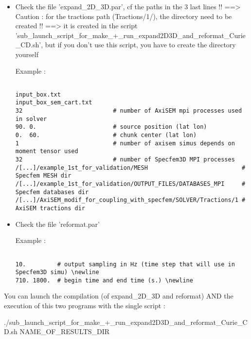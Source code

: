 \documentclass[11pt]{article}
\begin{document}
\begin{itemize}

\item[\textbullet] Check the file 'expand\_2D\_3D.par', cf the paths in the 3 last lines !! ==> Caution : for the tractions path (Tractions/1/), the directory need to be created !! ==> it is created in the script 'sub\_launch\_script\_for\_make\_+\_run\_expand2D3D\_and\_reformat\_Curie\_CD.sh', but if you don't use this script, you have to create the directory yourself

\smallskip

\noindent Example : 
\begin{verbatim}

input_box.txt 
input_box_sem_cart.txt 
32                          # number of AxiSEM mpi processes used in solver  
90. 0.                      # source position (lat lon)  
0.  60.                     # chunk center (lat lon)    
1                           # number of axisem simus depends on moment tensor used  
32                          # number of Specfem3D MPI processes  
/[...]/example_1st_for_validation/MESH                           # Specfem MESH dir
/[...]/example_1st_for_validation/OUTPUT_FILES/DATABASES_MPI     # Specfem databases dir
/[...]/AxiSEM_modif_for_coupling_with_specfem/SOLVER/Tractions/1 # AxiSEM tractions dir

\end{verbatim}

\item[\textbullet] Check the file 'reformat.par'

\smallskip

\noindent Example : 
\begin{verbatim}

10.         # output sampling in Hz (time step that will use in Specfem3D simu) \newline
710. 1800.  # begin time and end time (s.) \newline

\end{verbatim}

\end{itemize}

\medskip

\noindent You can launch the compilation (of expand\_2D\_3D and reformat) AND the execution of this two programs with the single script : 

\smallskip

\noindent ./sub\_launch\_script\_for\_make\_+\_run\_expand2D3D\_and\_reformat\_Curie\_CD.sh NAME\_OF\_RESULTS\_DIR
\end{document}
